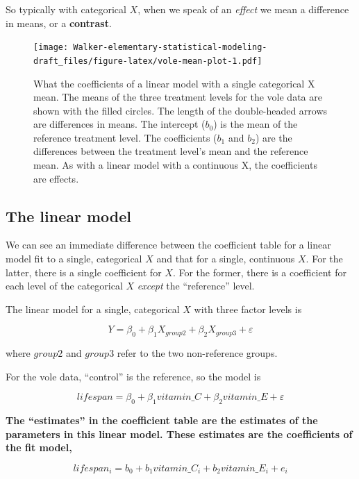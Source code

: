 \documentclass[]{book}
\begin{document}
So typically with categorical \(X\), when we speak of an \emph{effect}
we mean a difference in means, or a \textbf{contrast}.

\begin{figure}
\centering
\texttt{[image: Walker-elementary-statistical-modeling-draft\_files/figure-latex/vole-mean-plot-1.pdf]}
\caption{\label{fig:vole-mean-plot}What the coefficients of a linear model
with a single categorical X mean. The means of the three treatment
levels for the vole data are shown with the filled circles. The length
of the double-headed arrows are differences in means. The intercept
(\(b_0\)) is the mean of the reference treatment level. The coefficients
(\(b_1\) and \(b_2\)) are the differences between the treatment level's
mean and the reference mean. As with a linear model with a continuous X,
the coefficients are effects.}
\end{figure}

\subsection{The linear model}\label{the-linear-model}

We can see an immediate difference between the coefficient table for a
linear model fit to a single, categorical \(X\) and that for a single,
continuous \(X\). For the latter, there is a single coefficient for
\(X\). For the former, there is a coefficient for each level of the
categorical \(X\) \emph{except} the ``reference'' level.

The linear model for a single, categorical \(X\) with three factor
levels is

\begin{equation}
Y = \beta_0 + \beta_1 X_{group2} + \beta_2 X_{group3} + \varepsilon
\end{equation}

where \(group2\) and \(group3\) refer to the two non-reference groups.

For the vole data, ``control'' is the reference, so the model is

\begin{equation}
lifespan = \beta_0 + \beta_1 vitamin\_C + \beta_2 vitamin\_E + \varepsilon
\end{equation}

\textbf{The ``estimates'' in the coefficient table are the estimates of
the parameters in this linear model. These estimates are the
coefficients of the fit model,}

\begin{equation}
lifespan_i = b_0 + b_1 vitamin\_C_i + b_2 vitamin\_E_i + e_i
\label{eq:model-cat-x}
\end{equation}
\end{document}
